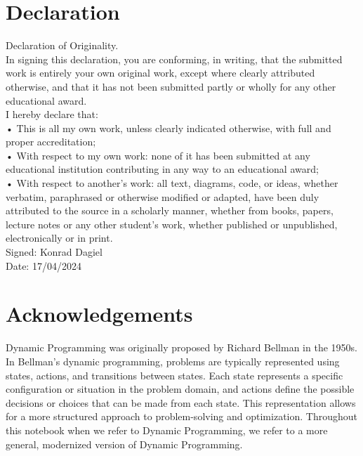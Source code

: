 \documentclass[12pt]{report}
\theoremstyle{definition}
\begin{document}
\chapter*{Declaration}
Declaration of Originality.\\
In signing this declaration, you are conforming, in writing, that the submitted work is entirely your own original work, except where clearly attributed otherwise, and that it has not been submitted partly or wholly for
any other educational award.\\
I hereby declare that:\\
• This is all my own work, unless clearly indicated otherwise, with full
and proper accreditation;\\
• With respect to my own work: none of it has been submitted at any educational institution contributing in any way to an educational award;\\
• With respect to another's work: all text, diagrams, code, or ideas,
whether verbatim, paraphrased or otherwise modified or adapted, have
been duly attributed to the source in a scholarly manner, whether
from books, papers, lecture notes or any other student's work, whether
published or unpublished, electronically or in print.\\
Signed: Konrad Dagiel\\
Date: 17/04/2024

\chapter*{Acknowledgements}
Dynamic Programming was originally proposed by Richard Bellman in the 1950s.
In Bellman's dynamic programming, problems are typically represented using states, actions, and transitions between states.
Each state represents a specific configuration or situation in the problem domain, and actions define the possible decisions or choices that can be made from each state.
This representation allows for a more structured approach to problem-solving and optimization.
Throughout this notebook when we refer to Dynamic Programming, we refer to a more general, modernized version of Dynamic Programming.

\tableofcontents






\end{document}
